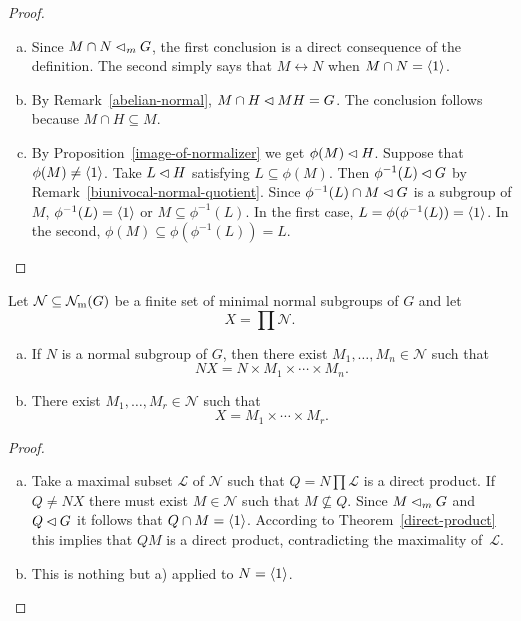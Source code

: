 \begin{proof}\ 
\begin{enumerate}[a),font=\upshape]
    \item Since $M\cap N\lhd_mG$, the first conclusion is a direct consequence of the definition. The second simply says that $M\leftrightarrow N$ when $M\cap N=\langle1\rangle$.

    \item By Remark~\ref{abelian-normal}, $M\cap H\lhd MH=G$. The conclusion follows because $M\cap H\subseteq M$.

    \item By Proposition~\ref{image-of-normalizer} we get $\phi(M)\lhd H$. Suppose that $\phi(M)\ne\langle1\rangle$. Take $L\lhd H$ satisfying $L\subseteq\phi(M)$. Then $\phi^{-1}(L)\lhd G$ by Remark~\ref{biunivocal-normal-quotient}. Since $\phi^{-1}(L)\cap M\lhd G$ is a subgroup of $M$, $\phi^{-1}(L)=\langle1\rangle$ or $M\subseteq\phi^{-1}(L)$. In the first case, $L=\phi(\phi^{-1}(L))=\langle1\rangle$. In the second, $\phi(M)\subseteq\phi(\phi^{-1}(L))=L$.
\end{enumerate}
\end{proof}

\begin{thm}\label{product-of-minimal-normal}
    Let\/ $\mathcal N\subseteq\operatorname{{\cal N}_m}(G)$ be a finite set of minimal normal subgroups of\/ $G$ and let
    $$
        X = \prod\mathcal N.
    $$
    \begin{enumerate}[a),font=\upshape]
    \item If\/ $N$ is a normal subgroup of\/ $G$, then there exist\/ $M_1, \dots, M_n \in\mathcal N$ such that
    $$
        NX = N \times M_1 \times \cdots \times M_n.
    $$
    \item There exist\/ $M_1, \ldots, M_r \in\mathcal N$ such that
    $$
        X = M_1 \times \cdots \times M_r.
    $$
    \end{enumerate}
\end{thm}

\begin{proof}\ 
\begin{enumerate}[a),font=\upshape]
    \item Take a maximal subset $\mathcal L$ of $\mathcal N$ such that $Q=N\prod\mathcal L$ is a direct product. If $Q\ne NX$ there must exist $M\in\mathcal N$ such that $M\not\subseteq Q$. Since $M\lhd_mG$ and $Q\lhd G$ it follows that $Q\cap M=\langle1\rangle$. According to Theorem~\ref{direct-product} this implies that $QM$ is a direct product, contradicting the maximality of~$\mathcal L$.

    \item This is nothing but a) applied to $N=\langle1\rangle$.
\end{enumerate}
\end{proof}


